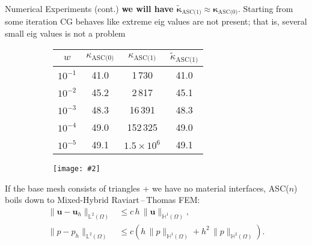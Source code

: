 \documentclass[final, svgnames]{beamer}
\newlength{\onecolwid}
\newcommand{\includegraphicsw}[2][1.]{\texttt{[image: \#2]}}
\newcommand{\vect}[1]{\boldsymbol{\mathbf{#1}}}
\newcommand{\LTwoSpace}[1][\Omega]{{\mathbb L^2\left({#1}\right)}}
\newcommand{\HSpace}[1]{{\mathbb H^{#1}\left(\Omega\right)}}
\begin{document}
\begin{frame}[t]
\begin{columns}[t]
\begin{column}{\onecolwid}
\begin{block}{Numerical Experiments (cont.)}
\textbf{we will have $\tilde{\vect\kappa}_{\text{ASC(1)}} \approx \vect\kappa_{\text{ASC(0)}}$}.
Starting from some iteration CG behaves like extreme eig values are not present; that is, several small eig values is not a problem
\begin{figure}
	\centering
	\caption{Condition Numbers of ASC(0)\,/\,ASC(1) Matrices} 
	\begin{subfigure}{.45\linewidth}
		\centering\tiny
		\begin{tabular}[1.2]{ | c | c | c | c |}
			\hline
			$w$ & $\kappa_{\text{ASC(0)}}$ & $\kappa_{\text{ASC(1)}}$ & $\widetilde\kappa_{\text{ASC(1)}}$\\
			\hline
			$10^{-1}$ & 41.0 & 1\,730       & 41.0  \\
			\hline
			$10^{-2}$ & 45.2 & 2\,817       & 45.1  \\
			\hline
			$10^{-3}$ & 48.3 & 16\,391      & 48.3   \\
			\hline
			$10^{-4}$ & 49.0 & 152\,325     & 49.0    \\
			\hline
			$10^{-5}$ & 49.1 & $1.5\times10^6$&49.1  \\
			\hline
		\end{tabular}%
	\end{subfigure}%
	\hfill
	\begin{subfigure}{.55\linewidth}
		\centering
		\includegraphicsw{logplot.png}
	\end{subfigure}
\end{figure}
If the base mesh consists of triangles + we have no material interfaces, ASC($n$) boils down to Mixed-Hybrid Raviart\,--\,Thomas FEM:
\begin{align*}
\|\vect u - \vect u_h\|_{\LTwoSpace} &\le c\,h\,\|\vect u\|_{\HSpace{1}},\\
\|p - p_h\|_{\LTwoSpace} &\le c \left( h\,\|p\|_{\HSpace{1}} + h^2\,\|p\|_{\HSpace{2}} \right).

\end{align*}
\end{block}
\end{column}
\end{columns}
\end{frame}
\end{document}
